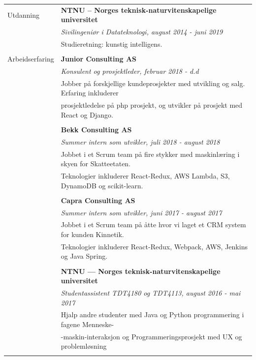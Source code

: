 \documentclass[letterpaper,10pt,oneside]{article}
\begin{document}
\noindent \begin{longtable}{@{} l l}
  \Large{Utdanning} & \textbf{NTNU – Norges teknisk-naturvitenskapelige universitet} \\
  & \textit{Sivilingeniør i Datateknologi, august 2014 - juni 2019}\\
     & Studieretning: kunstig intelligens.\\
     & \\
     \Large{Arbeidserfaring} 
     & \textbf{Junior Consulting AS} \\
     & \textit{Konsulent og prosjektleder, februar 2018 - d.d} \\
     & Jobber på forskjellige kundeprosjekter med utvikling og salg. Erfaring inkluderer \\
     & prosjektledelse på php prosjekt, og utvikler på prosjekt med React og Django.\\
     & \\
     & \textbf{Bekk Consulting AS} \\
     & \textit{Summer intern som utvikler, juli 2018 - august 2018} \\
     & Jobbet i et Scrum team på fire stykker med maskinlæring i skyen for Skatteetaten.\\
     & Teknologier inkluderer React-Redux, AWS Lambda, S3, DynamoDB og scikit-learn.\\
     & \\
     & \textbf{Capra Consulting AS} \\
     & \textit{Summer intern som utvikler, juni 2017 - august 2017} \\
     & Jobbet i et Scrum team på åtte hvor vi laget et CRM system for kunden Kinnetik.\\
     & Teknologier inkluderer React-Redux, Webpack, AWS, Jenkins og Java Spring.\\
     & \\
     & \textbf{NTNU --- Norges teknisk-naturvitenskapelige universitet} \\
     & \textit{Studentassistent TDT4180 og TDT4113, august 2016 - mai 2017}\\
     & Hjalp andre studenter med Java og Python programmering i fagene Menneske-\\
     & -maskin-interaksjon og Programmeringsprosjekt med UX og problemløsning\\
     & \\


\end{longtable}
\end{document}
